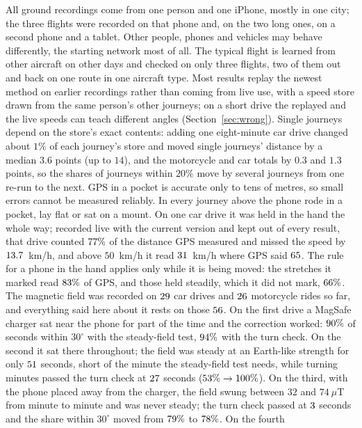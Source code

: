 \documentclass[11pt]{article}
\newcommand{\dg}{^\circ}
\begin{document}
All ground recordings come from one person and one iPhone, mostly in one city; the three flights were
recorded on that phone and, on the two long ones, on a second phone and a tablet. Other people, phones and
vehicles may behave differently, the starting network most of all. The typical flight is learned from
other aircraft on other days and checked on only three flights, two of them out and back on one route in
one aircraft type. Most results replay the newest method on earlier recordings
rather than coming from live use, with a speed store drawn from the same person's other journeys; on a
short drive the replayed and the live speeds can teach different angles (Section~\ref{sec:wrong}).
Single journeys depend on the store's exact contents: adding one eight-minute car drive changed
about $1\%$ of each journey's store and moved single journeys' distance by a median $3.6$ points (up to
$14$), and the motorcycle and car totals by $0.3$ and $1.3$ points, so the shares of journeys within
$20\%$ move by several journeys from one re-run to the next. GPS in a pocket is
accurate only to tens of metres, so small errors cannot be measured reliably. In every journey above
the phone rode in a pocket, lay flat or sat on a mount. On one car drive it was held in the hand the
whole way; recorded live with the current version and kept out of every result, that drive counted
$77\%$ of the distance GPS measured and missed the speed by $13.7$~km/h, and above $50$~km/h
it read $31$~km/h where GPS said $65$. The rule for a phone in the hand applies only
while it is being moved: the stretches it marked read $83\%$ of GPS, and those held steadily,
which it did not mark, $66\%$. The magnetic field was
recorded on $29$ car drives and $26$ motorcycle rides\nMagOtherTxt{} so far, and everything said here about it rests on
those $56$. On the first drive a MagSafe charger sat near the phone for part of the time and the
correction worked: $90\%$ of seconds within $30\dg$ with the steady-field test, $94\%$ with the turn check. On
the second it sat there throughout; the field was steady at an Earth-like strength for only $51$
seconds, short of the minute the steady-field test needs, while turning minutes passed the turn check
at $27$ seconds ($53\% \to 100\%$). On the third, with the phone placed away from the
charger, the field swung between $32$ and $74~\mu$T from minute to minute and was never steady; the turn
check passed at $3$ seconds and the share within $30\dg$ moved from $79\%$ to $78\%$. On the fourth
\end{document}
